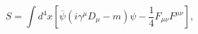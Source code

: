 \begin{equation}
S=\int d^{4}x\left[ \overline{\psi }\left( i\gamma ^{\mu }D_{\mu }-m\right)
\psi -\frac{1}{4}F_{\mu \nu }F^{\mu \nu }\right] ,  
\end{equation}

